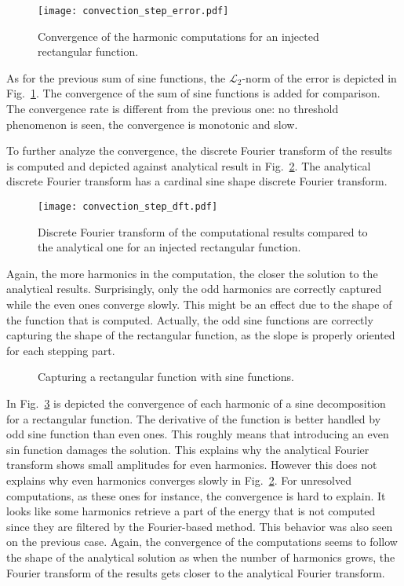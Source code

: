 \begin{figure}[htbp]
  \centering
  \texttt{[image: convection\_step\_error.pdf]}
  \caption{Convergence of the harmonic computations for an injected
    rectangular function.}
  \label{fig:conv_step}
\end{figure}
As for the previous sum of sine functions, the $\mathcal{L}_2$-norm 
of the error is depicted in Fig.~\ref{fig:conv_step}. 
The convergence of the sum of sine functions is added for comparison.
The convergence rate is different from the previous one: no threshold phenomenon
is seen, the convergence is monotonic and slow.

To further analyze the convergence, 
the discrete Fourier transform of the results
is computed and depicted against analytical result in Fig.~\ref{fig:dft_step}.
The analytical discrete Fourier transform has
 a cardinal sine shape discrete Fourier transform.
\begin{figure}[htbp]
  \centering
  \texttt{[image: convection\_step\_dft.pdf]}
  \caption{Discrete Fourier transform of the computational
  results compared to the analytical one for an injected 
  rectangular function.}
  \label{fig:dft_step}
\end{figure}
Again, the more harmonics in the computation, the closer the solution
to the analytical results. Surprisingly, only the odd harmonics are
correctly captured while the even ones converge slowly. This might be an
effect due to the shape of the function that is computed. Actually, the odd
sine functions are correctly capturing the shape of the rectangular function, 
as the slope is properly oriented for each stepping part.
\begin{figure}[htbp]
  \centering
  \caption{Capturing a rectangular function with sine functions.}
  \label{fig:step_conv_sine}
\end{figure}
In Fig.~\ref{fig:step_conv_sine} is depicted the convergence of each harmonic
of a sine decomposition for a rectangular function. 
The derivative of the function is better 
handled by odd sine function than even ones. 
This roughly means that introducing an even sin function
damages the solution.
This explains
why the analytical Fourier transform shows small amplitudes for even harmonics.
However this does not explains why even harmonics converges slowly
in Fig.~\ref{fig:dft_step}. For unresolved computations, as these ones for
instance, the convergence is hard to explain. It looks like some harmonics
retrieve a part of the energy that is not computed since they are
filtered by the Fourier-based method. This behavior was also seen on the
previous case.
Again, the convergence of the computations seems
to follow the shape of the analytical solution as when the number
of harmonics grows, the Fourier transform of the results gets closer
to the analytical Fourier transform.

